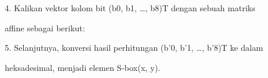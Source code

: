 \documentclass{article}
\begin{document}

4. Kalikan vektor kolom bit (b0, b1, …, b8)T dengan sebuah matriks 

affine sebagai berikut:

5. Selanjutnya, konversi hasil perhitungan (b’0, b’1, …, b’8)T ke dalam 

heksadesimal, menjadi elemen S-box(x, y).






































































































\end{document}
